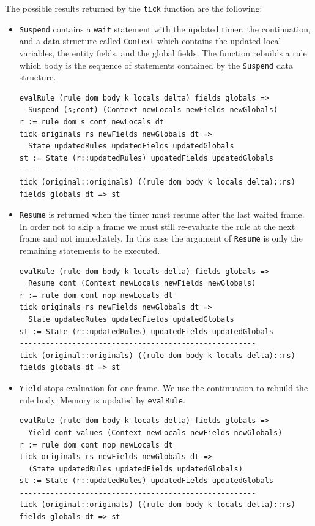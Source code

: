 The possible results returned by the \texttt{tick} function are the following:
\begin{itemize}
\item \texttt{Suspend} contains a \texttt{wait} statement with the updated timer, the continuation, and a data structure called \texttt{Context} which contains the updated local variables, the entity fields, and the global fields. The function rebuilds a rule which body is the sequence of statements contained by the \texttt{Suspend} data structure.
\begin{lstlisting}
evalRule (rule dom body k locals delta) fields globals => 
  Suspend (s;cont) (Context newLocals newFields newGlobals)
r := rule dom s cont newLocals dt
tick originals rs newFields newGlobals dt => 
  State updatedRules updatedFields updatedGlobals
st := State (r::updatedRules) updatedFields updatedGlobals
------------------------------------------------------
tick (original::originals) ((rule dom body k locals delta)::rs) fields globals dt => st
\end{lstlisting}
\item \texttt{Resume} is returned when the timer must resume after the last waited frame. In order not to skip a frame we must still re-evaluate the rule at the next frame and not immediately. In this case the argument of \texttt{Resume} is only the remaining statements to be executed.
\begin{lstlisting}
evalRule (rule dom body k locals delta) fields globals => 
  Resume cont (Context newLocals newFields newGlobals)
r := rule dom cont nop newLocals dt
tick originals rs newFields newGlobals dt => 
  State updatedRules updatedFields updatedGlobals
st := State (r::updatedRules) updatedFields updatedGlobals
------------------------------------------------------
tick (original::originals) ((rule dom body k locals delta)::rs) fields globals dt => st
\end{lstlisting}
\item \texttt{Yield} stops evaluation for one frame. We use the continuation to rebuild the rule body. Memory is updated by \texttt{evalRule}.
\begin{lstlisting}
evalRule (rule dom body k locals delta) fields globals => 
  Yield cont values (Context newLocals newFields newGlobals)
r := rule dom cont nop newLocals dt
tick originals rs newFields newGlobals dt => 
  (State updatedRules updatedFields updatedGlobals)
st := State (r::updatedRules) updatedFields updatedGlobals
------------------------------------------------------
tick (original::originals) ((rule dom body k locals delta)::rs) fields globals dt => st

\end{lstlisting}
\end{itemize}
